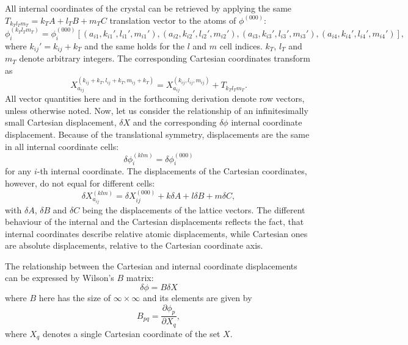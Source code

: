 \documentclass[prl,aps,preprint,superbib,12pt]{revtex4}
\begin{document}
All internal coordinates of the crystal can be retrieved
by applying the same $T_{k_{T}l_{T}m_{T}}=k_{T}A+l_{T}B+m_{T}C$ 
translation vector to the atoms of $\phi^{(000)}$: 
\begin{equation}
\phi^{(k_{T}l_{T}m_{T})}_{i}=\phi^{(000)}_{i}[
(a_{i1},k_{i1}',l_{i1}',m_{i1}'),
(a_{i2},k_{i2}',l_{i2}',m_{i2}'),
(a_{i3},k_{i3}',l_{i3}',m_{i3}'),
(a_{i4},k_{i4}',l_{i4}',m_{i4}')] ,
\end{equation}
where $k_{ij}'=k_{ij}+k_{T}$ and the same holds for the $l$ and $m$ 
cell indices.
$k_{T}$, $l_{T}$ and $m_{T}$ denote arbitrary integers.
The corresponding Cartesian coordinates transform as
\begin{equation}
X^{(k_{ij}+k_{T},l_{ij}+k_{T},m_{ij}+k_{T})}_{a_{ij}} 
= X^{(k_{ij},l_{ij},m_{ij})}_{a_{ij}} + T_{k_{T}l_{T}m_{T}} .
\end{equation} 
All vector quantities here and in the forthcoming derivation
denote row vectors, unless otherwise noted.
Now, let us consider the relationship of an infinitesimally small
Cartesian displacement, $\delta X$ and the corresponding $\delta \phi$
internal coordinate displacement.
Because of the translational symmetry, displacements are the same
in all internal coordinate cells:
\begin{equation}
\delta \phi^{(klm)}_{i} = \delta \phi^{(000)}_{i} 
\end{equation}
for any $i$-th internal coordinate.
The displacements of the Cartesian coordinates, however, do not equal
for different cells: 
\begin{equation} \label{cartdispl}
\delta X^{(klm)}_{a_{ij}} = \delta X^{(000)}_{ij} + k \delta A 
+ l \delta B + m \delta C ,
\end{equation}
with $\delta A$, $\delta B$ and $\delta C$
being the displacements of the lattice vectors. 
The different behaviour of the internal and the Cartesian displacements
reflects the fact, that internal coordinates describe relative
atomic displacements, while Cartesian ones are absolute displacements, 
relative to the Cartesian coordinate axis.

The relationship between the Cartesian and internal coordinate 
displacements can be expressed by Wilson's $B$ matrix:
\begin{equation}
\delta \phi = B \delta X
\end{equation}
where $B$ here has the size of $\infty \times \infty$ and its
elements are given by
\begin{equation}
B_{pq}= \frac{\partial \phi_{p}}{\partial X_{q}} , 
\end{equation}
where $X_{q}$ denotes a single Cartesian coordinate of the set $X$.
\end{document}
